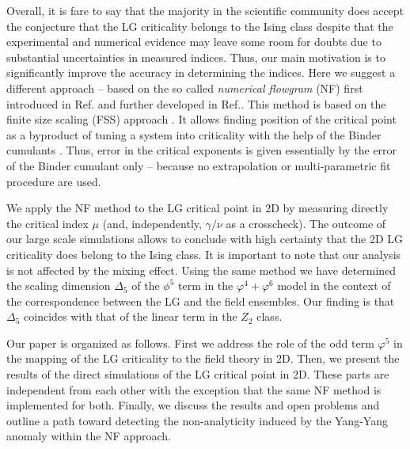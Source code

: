 \documentclass[prb,aps,twocolumn,groupedaddress,floats,showpacs,final]{revtex4}
\begin{document}
Overall, it is fare to say that the majority in the scientific community does accept the conjecture that the LG criticality belongs to the Ising class despite that the experimental and numerical evidence may leave some room for doubts  due to substantial uncertainties in measured indices. Thus, our main motivation is to significantly improve the accuracy in determining the indices.
Here we suggest a different approach -- based on the so called {\it numerical flowgram} (NF) first introduced in Ref.\cite{Annals} and further developed in Ref.\cite{NJP}. This method is based on the finite size scaling (FSS) approach \cite{FSS}. It allows finding  position of the critical point as a byproduct of tuning a system into criticality with the help of the Binder cumulants \cite{Binder}.  Thus,  error in the critical exponents is given essentially by the error of the Binder cumulant only --  because no extrapolation or multi-parametric fit procedure are used. 

We apply the NF method to the LG critical point in 2D by measuring directly the critical index $\mu$ (and, independently, $\gamma/\nu$ as a crosscheck). The outcome of our large scale simulations allows to conclude with high certainty that the 2D LG criticality does belong to the Ising class.
 It is important to note that our analysis is not affected by the mixing effect. 
  Using the same method we have determined the scaling dimension $\Delta_5$ of the $\phi^5$ term in the $\varphi^4 + \varphi^6$ model in the context of the correspondence between the LG and the field ensembles. Our finding is that $\Delta_5$  coincides with that of the linear term in the $Z_2$ class.  

Our paper is organized as follows. First we address the role of the odd term $\varphi^5$ in the mapping \cite{Hubbard} of the LG criticality to the field theory in 2D. Then, we present the results of the direct simulations of the LG critical point in 2D. These parts are independent from each other with the exception that the same NF method is implemented for both. 
Finally, we discuss the results and open problems and outline a path toward detecting the non-analyticity induced by the Yang-Yang anomaly \cite{Fisher2000} within the NF approach.
\end{document}
